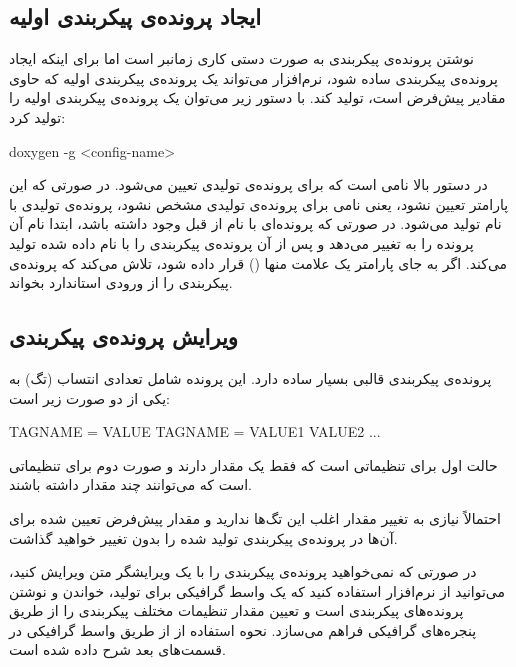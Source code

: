 \subsection{ایجاد پرونده‌ی پیکربندی اولیه}

نوشتن پرونده‌ی پیکربندی به صورت دستی کاری زمانبر است اما برای اینکه ایجاد
پرونده‌ی پیکربندی ساده شود، نرم‌افزار  می‌تواند یک پرونده‌ی پیکربندی
اولیه که حاوی مقادیر پیش‌فرض است، تولید کند. با دستور زیر می‌توان یک پرونده‌ی
پیکربندی اولیه را تولید کرد:

\begin{Shell}  
doxygen -g <config-name>
\end{Shell}

در دستور بالا  نامی است که برای پرونده‌ی تولیدی تعیین می‌شود.
در صورتی که این پارامتر تعیین نشود، یعنی نامی برای پرونده‌ی تولیدی مشخص نشود،
پرونده‌ی تولیدی با نام  تولید می‌شود.
در صورتی که پرونده‌ای با نام  از قبل وجود داشته باشد،
 ابتدا نام آن پرونده را به  تغییر می‌دهد و پس
از آن پرونده‌ی پیکربندی را با نام داده شده تولید می‌کند.
اگر به جای پارامتر  یک علامت منها (\-) قرار داده شود،
 تلاش می‌کند که پرونده‌ی پیکربندی را از ورودی استاندارد 
بخواند.

\subsection{ویرایش پرونده‌ی پیکربندی}

پرونده‌ی پیکربندی قالبی بسیار ساده دارد. این پرونده شامل تعدادی انتساب (تگ) به
یکی از دو صورت زیر است:

\begin{Config}
TAGNAME = VALUE
TAGNAME = VALUE1 VALUE2 ...
\end{Config}

حالت اول برای تنظیماتی است که فقط یک مقدار دارند و صورت دوم برای تنظیماتی است که
می‌توانند چند مقدار داشته باشند.

احتمالاً نیازی به تغییر مقدار اغلب این تگ‌ها ندارید و مقدار پیش‌فرض تعیین شده
برای آن‌ها در پرونده‌ی پیکربندی تولید شده را بدون تغییر خواهید گذاشت.

در صورتی که نمی‌خواهید پرونده‌ی پیکربندی را با یک ویرایشگر متن ویرایش کنید،
می‌توانید از نرم‌افزار  استفاده کنید که یک واسط گرافیکی برای
تولید، خواندن و نوشتن پرونده‌های پیکربندی است و تعیین مقدار تنظیمات مختلف
پیکربندی را از طریق پنجره‌های گرافیکی فراهم می‌سازد. نحوه استفاده از
 از طریق واسط گرافیکی  در قسمت‌های بعد شرح داده شده
است.

